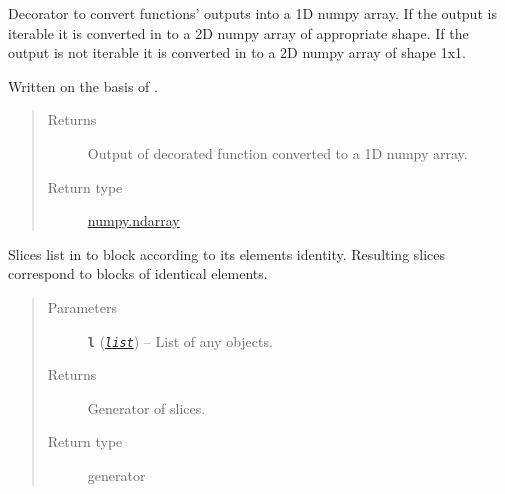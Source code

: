 \documentclass[a4paper,10pt,english]{sphinxmanual}
\begin{document}

\begin{fulllineitems}
\label{aqueduct.utils.helpers:aqueduct.utils.helpers.arrayify1}
Decorator to convert functions' outputs into a 1D numpy array. If the output is iterable it is converted in to a 2D numpy array
of appropriate shape. If the output is not iterable it is converted in to a 2D numpy array of shape 1x1.

Written on the basis of {\hyperref[aqueduct.utils.helpers:aqueduct.utils.helpers.listify]{}}.
\begin{quote}\begin{description}
\item[{Returns}] \leavevmode
Output of decorated function converted to a 1D numpy array.

\item[{Return type}] \leavevmode
\href{http://docs.scipy.org/doc/numpy/reference/generated/numpy.ndarray.html\#numpy.ndarray}{numpy.ndarray}

\end{description}\end{quote}

\end{fulllineitems}


\begin{fulllineitems}
\label{aqueduct.utils.helpers:aqueduct.utils.helpers.list_blocks_to_slices}
Slices list in to block according to its elements identity. Resulting slices correspond to blocks of
identical elements.
\begin{quote}\begin{description}
\item[{Parameters}] \leavevmode
\textbf{\texttt{l}} (\href{http://docs.python.org/2/library/functions.html\#list}{\emph{\texttt{list}}}) -- List of any objects.

\item[{Returns}] \leavevmode
Generator of slices.

\item[{Return type}] \leavevmode
generator

\end{description}\end{quote}

\end{fulllineitems}
\end{document}
